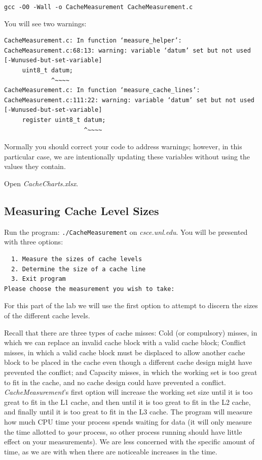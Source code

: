 \texttt{gcc -O0 -Wall -o CacheMeasurement CacheMeasurement.c}

You will see two warnings:
\begin{verbatim}
CacheMeasurement.c: In function ‘measure_helper’:
CacheMeasurement.c:68:13: warning: variable ‘datum’ set but not used [-Wunused-but-set-variable]
     uint8_t datum;
             ^~~~~
CacheMeasurement.c: In function ‘measure_cache_lines’:
CacheMeasurement.c:111:22: warning: variable ‘datum’ set but not used [-Wunused-but-set-variable]
     register uint8_t datum;
                      ^~~~~
\end{verbatim}

Normally you should correct your code to address warnings; however, in this
particular case, we are intentionally updating these variables without using
the values they contain.

Open \textit{CacheCharts.xlsx}.

\subsection{Measuring Cache Level Sizes}

Run the program: \texttt{./CacheMeasurement} on \textit{csce.unl.edu}. You will
be presented with three options:

\begin{verbatim}
  1. Measure the sizes of cache levels
  2. Determine the size of a cache line
  3. Exit program
Please choose the measurement you wish to take:
\end{verbatim}

For this part of the lab we will use the first option to attempt to discern the
sizes of the different cache levels.

Recall that there are three types of cache misses: Cold (or compulsory) misses,
in which we can replace an invalid cache block with a valid cache block;
Conflict misses, in which a valid cache block must be displaced to allow
another cache block to be placed in the cache even though a different cache
design might have prevented the conflict; and Capacity misses, in which the
working set is too great to fit in the cache, and no cache design could have
prevented a conflict. \textit{CacheMeasurement}'s first option will increase the
working set size until it is too great to fit in the L1 cache, and then until it
is too great to fit in the L2 cache, and finally until it is too great to fit in
the L3 cache. The program will measure how much CPU time your process spends
waiting for data (it will only measure the time allotted to \textit{your}
process, so other process running should have little effect on your
measurements). We are less concerned with the specific amount of time, as we are
with when there are noticeable increases in the time.

